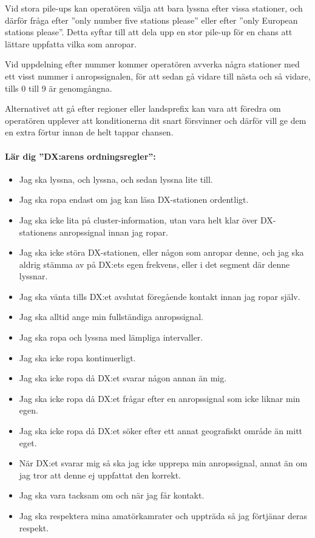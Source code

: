 Vid stora pile-ups kan operatören välja att bara lyssna efter vissa stationer,
och därför fråga efter ''only number five stations please'' eller efter ''only
European stations please''.
Detta syftar till att dela upp en stor pile-up för en chans att lättare
uppfatta vilka som anropar.

Vid uppdelning efter nummer kommer operatören avverka några stationer med ett
visst nummer i anropssignalen, för att sedan gå vidare till nästa och så
vidare, tills 0 till 9 är genomgångna.

Alternativet att gå efter regioner eller landsprefix kan vara att föredra om
operatören upplever att konditionerna dit snart försvinner och därför vill ge
dem en extra förtur innan de helt tappar chansen.

\paragraph{Lär dig ''DX:arens ordningsregler'':}

\begin{itemize}
\item Jag ska lyssna, och lyssna, och sedan lyssna lite till.
\item Jag ska ropa endast om jag kan läsa DX-stationen ordentligt.
\item Jag ska icke lita på cluster-information, utan vara helt klar över DX-stationens anropssignal innan jag ropar.
\item Jag ska icke störa DX-stationen, eller någon som anropar denne, och jag ska aldrig stämma av på DX:ets egen frekvens, eller i det segment där denne lyssnar.
\item Jag ska vänta tills DX:et avslutat föregående kontakt innan jag ropar själv.
\item Jag ska alltid ange min fullständiga anropssignal.
\item Jag ska ropa och lyssna med lämpliga intervaller.
\item Jag ska icke ropa kontinuerligt.
\item Jag ska icke ropa då DX:et svarar någon annan än mig.
\item Jag ska icke ropa då DX:et frågar efter en anropssignal som icke liknar min egen.
\item Jag ska icke ropa då DX:et söker efter ett annat geografiskt område än mitt eget.
\item När DX:et svarar mig så ska jag icke upprepa min anropssignal, annat än om jag tror att denne ej uppfattat den korrekt.
\item Jag ska vara tacksam om och när jag får kontakt.
\item Jag ska respektera mina amatörkamrater och uppträda så jag förtjänar deras respekt.
\end{itemize}

